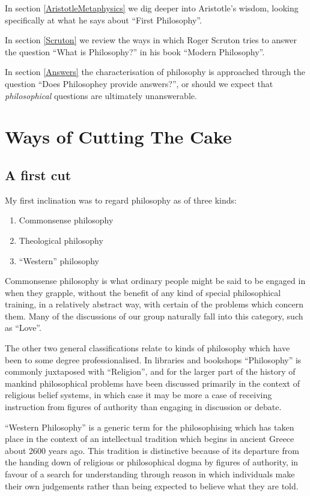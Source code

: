 \documentclass[10pt,titlepage]{article}
\begin{document}
In section \ref{AristotleMetaphysics} we dig deeper into Aristotle's wisdom, looking specifically at what he says about ``First Philosophy''.

In section \ref{Scruton} we review the ways in which Roger Scruton tries to answer the question ``What is Philosophy?'' in his book ``Modern Philosophy''\cite{scruton97}.

In section \ref{Answers} the characterisation of philosophy is approached through the question ``Does Philosophey provide answers?'', or should we expect that {\it philosophical} questions are ultimately unanswerable.


\section{Ways of Cutting The Cake}\label{CuttingCake}

\subsection{A first cut}

My first inclination was to regard philosophy as of three kinds:

\begin{enumerate}
\item Commonsense philosophy
\item Theological philosophy
\item ``Western'' philosophy
\end{enumerate}

Commonsense philosophy is what ordinary people might be said to be engaged in when they grapple, without the benefit of any kind of special philosophical training, in a relatively abstract way, with certain of the problems which concern them.
Many of the discussions of our group naturally fall into this category, such as ``Love''.

The other two general classifications relate to kinds of philosophy which have been to some degree professionalised.
In libraries and bookshops ``Philosophy'' is commonly juxtaposed with ``Religion'', and for the larger part of the history of mankind philosophical problems have been discussed primarily in the context of religious belief systems, in which case it may be more a case of receiving instruction from figures of authority than engaging in discussion or debate.

``Western Philosophy'' is a generic term for the philosophising which has taken place in the context of an intellectual tradition which begins in ancient Greece about 2600 years ago.
This tradition is distinctive because of its departure from the handing down of religious or philosophical dogma by figures of authority, in favour of a search for understanding through reason in which individuals make their own judgements rather than being expected to believe what they are told. 
\end{document}
